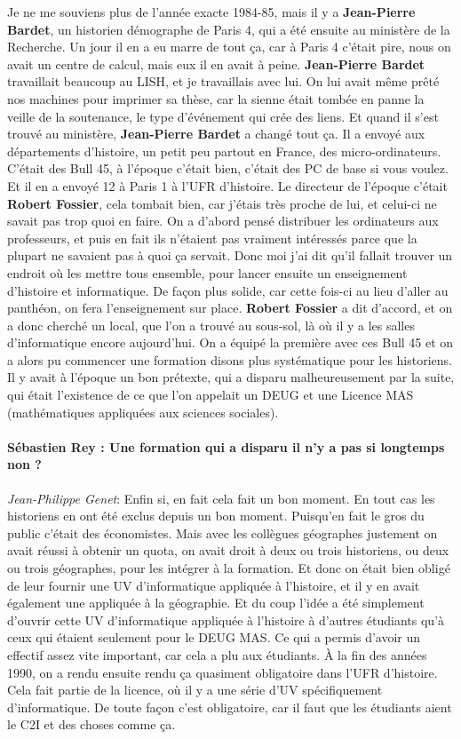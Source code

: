 Je ne me souviens plus de l'année exacte 1984-85, mais  il y a \textbf{Jean-Pierre Bardet}, un historien démographe de Paris 4, qui a été ensuite au ministère de la Recherche. Un jour il en a eu marre de tout ça, car à Paris 4 c'était pire, nous on avait un centre de calcul, mais eux il en avait à peine. \textbf{Jean-Pierre Bardet} travaillait beaucoup au LISH, et je travaillais avec lui. On lui avait même prêté nos machines pour imprimer sa thèse, car la sienne était tombée en panne la veille de la soutenance, le type d'événement qui crée des liens. Et quand il s'est trouvé au ministère, \textbf{Jean-Pierre Bardet} a changé tout ça. Il a envoyé aux départements d'histoire, un petit peu partout en France, des micro-ordinateurs. C'était des Bull 45, à l'époque c'était bien, c'était des PC de base si vous voulez. Et il en a envoyé 12 à Paris 1 à l'UFR d'histoire. Le directeur de l'époque c'était \textbf{Robert Fossier}, cela tombait bien, car j'étais très proche de lui, et celui-ci ne savait pas trop quoi en faire. On a d'abord pensé distribuer les ordinateurs aux professeurs, et puis en fait ils n'étaient pas vraiment intéressés parce que la plupart ne savaient pas à quoi ça servait. Donc moi j'ai dit qu'il fallait trouver un endroit où les mettre tous ensemble, pour lancer ensuite un enseignement d'histoire et informatique. De façon plus solide, car cette fois-ci au lieu d'aller au panthéon, on fera l'enseignement sur place. \textbf{Robert Fossier} a dit d'accord, et on a donc cherché un local, que l'on a trouvé au sous-sol, là où il y a les salles d'informatique encore aujourd'hui. On a équipé la première avec ces Bull 45 et on a alors pu commencer une formation disons plus systématique pour les historiens. Il y avait à l'époque un bon prétexte, qui a disparu malheureusement par la suite, qui était l'existence de ce que l'on appelait un DEUG et une Licence MAS (mathématiques appliquées aux sciences sociales). 

\paragraph*{Sébastien Rey : Une formation qui a disparu il n'y a pas si longtemps non ?}

\noindent\emph{Jean-Philippe Genet}: Enfin si, en fait cela fait un bon moment. En tout cas les historiens en ont été exclus depuis un bon moment. Puisqu'en fait le gros du public c'était des économistes. Mais avec les collègues géographes justement on avait réussi à obtenir un quota, on avait droit à deux ou trois historiens, ou deux ou trois géographes, pour les intégrer à la formation. Et donc on était bien obligé de leur fournir une UV d'informatique appliquée à l'histoire, et il y en avait également une appliquée à la géographie. Et du coup l'idée a été simplement d'ouvrir cette UV d'informatique appliquée à l'histoire à d'autres étudiants qu'à ceux qui étaient seulement pour le DEUG MAS. Ce qui a permis d'avoir un effectif  assez vite important, car cela a plu aux étudiants. À la fin des années 1990, on a rendu ensuite rendu ça quasiment obligatoire dans l'UFR d'histoire. Cela fait partie de la licence, où il y a une série d'UV spécifiquement d'informatique. De toute façon c'est obligatoire, car il faut que les étudiants aient le C2I et des choses comme ça.

